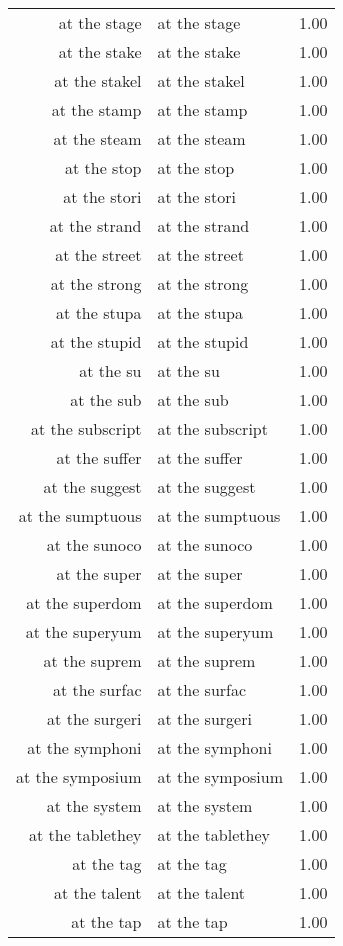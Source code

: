 \begin{table}[ht]
\begin{tabular}{rlr}
  at the stage & at the stage & 1.00 \\ 
  at the stake & at the stake & 1.00 \\ 
  at the stakel & at the stakel & 1.00 \\ 
  at the stamp & at the stamp & 1.00 \\ 
  at the steam & at the steam & 1.00 \\ 
  at the stop & at the stop & 1.00 \\ 
  at the stori & at the stori & 1.00 \\ 
  at the strand & at the strand & 1.00 \\ 
  at the street & at the street & 1.00 \\ 
  at the strong & at the strong & 1.00 \\ 
  at the stupa & at the stupa & 1.00 \\ 
  at the stupid & at the stupid & 1.00 \\ 
  at the su & at the su & 1.00 \\ 
  at the sub & at the sub & 1.00 \\ 
  at the subscript & at the subscript & 1.00 \\ 
  at the suffer & at the suffer & 1.00 \\ 
  at the suggest & at the suggest & 1.00 \\ 
  at the sumptuous & at the sumptuous & 1.00 \\ 
  at the sunoco & at the sunoco & 1.00 \\ 
  at the super & at the super & 1.00 \\ 
  at the superdom & at the superdom & 1.00 \\ 
  at the superyum & at the superyum & 1.00 \\ 
  at the suprem & at the suprem & 1.00 \\ 
  at the surfac & at the surfac & 1.00 \\ 
  at the surgeri & at the surgeri & 1.00 \\ 
  at the symphoni & at the symphoni & 1.00 \\ 
  at the symposium & at the symposium & 1.00 \\ 
  at the system & at the system & 1.00 \\ 
  at the tablethey & at the tablethey & 1.00 \\ 
  at the tag & at the tag & 1.00 \\ 
  at the talent & at the talent & 1.00 \\ 
  at the tap & at the tap & 1.00 \\ 

\end{tabular}
\end{table}
